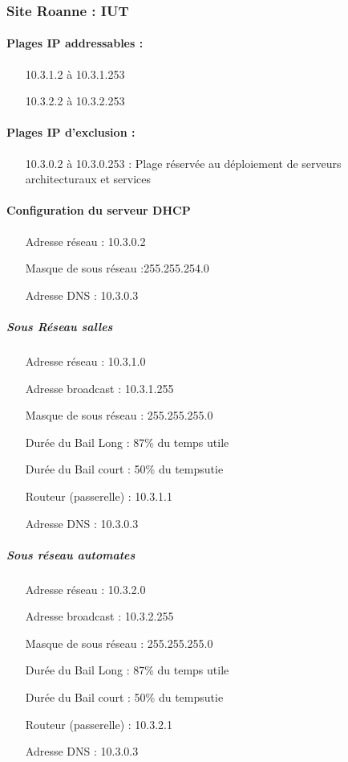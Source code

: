 \documentclass[a4paper]{article}
\begin{document}
\subsubsection{Site Roanne : IUT}

\paragraph{Plages IP addressables :} 
\begin{itemize}
\item[10.3.1.2 à 10.3.1.253]
\item[10.3.2.2 à 10.3.2.253]
\end{itemize}

\paragraph{Plages IP d'exclusion :}
\begin{itemize}
\item[10.3.0.2 à 10.3.0.253] : Plage réservée au déploiement de serveurs architecturaux et services
\end{itemize}

\paragraph{Configuration du serveur DHCP}

\begin{itemize}
\item[Adresse réseau]: 10.3.0.2
\item[Masque de sous réseau]:255.255.254.0
\item[Adresse DNS]: 10.3.0.3
\end{itemize}

\subparagraph{Sous Réseau salles}
\begin{itemize}
\item[Adresse réseau]: 10.3.1.0
\item[Adresse broadcast]: 10.3.1.255
\item[Masque de sous réseau]: 255.255.255.0
\item[Durée du Bail Long]: 87\% du temps utile
\item[Durée du Bail court]: 50\% du tempsutie
\item[Routeur (passerelle)]: 10.3.1.1
\item[Adresse DNS]: 10.3.0.3
\end{itemize}

\subparagraph{Sous réseau automates}
\begin{itemize}
\item[Adresse réseau]: 10.3.2.0
\item[Adresse broadcast]: 10.3.2.255
\item[Masque de sous réseau]: 255.255.255.0
\item[Durée du Bail Long]: 87\% du temps utile
\item[Durée du Bail court]: 50\% du tempsutie
\item[Routeur (passerelle)]: 10.3.2.1
\item[Adresse DNS]: 10.3.0.3
\end{itemize}
\end{document}
